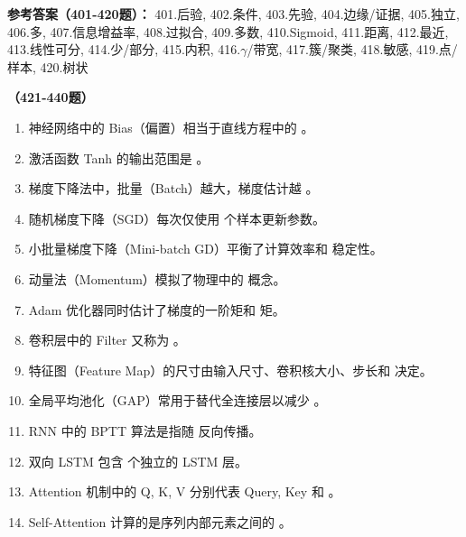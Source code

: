 \textbf{参考答案（401-420题）：}
401.后验, 402.条件, 403.先验, 404.边缘/证据, 405.独立, 406.多, 407.信息增益率, 408.过拟合, 409.多数, 410.Sigmoid, 411.距离, 412.最近, 413.线性可分, 414.少/部分, 415.内积, 416.$\gamma$/带宽, 417.簇/聚类, 418.敏感, 419.点/样本, 420.树状

\vspace{1em}
\textbf{（421-440题）}
\begin{enumerate}[resume,leftmargin=2em,itemsep=1pt]
\item 神经网络中的 Bias（偏置）相当于直线方程中的 \underline{\hspace{3em}}。
\item 激活函数 Tanh 的输出范围是 \underline{\hspace{3em}}。
\item 梯度下降法中，批量（Batch）越大，梯度估计越 \underline{\hspace{3em}}。
\item 随机梯度下降（SGD）每次仅使用 \underline{\hspace{3em}} 个样本更新参数。
\item 小批量梯度下降（Mini-batch GD）平衡了计算效率和 \underline{\hspace{3em}} 稳定性。
\item 动量法（Momentum）模拟了物理中的 \underline{\hspace{3em}} 概念。
\item Adam 优化器同时估计了梯度的一阶矩和 \underline{\hspace{3em}} 矩。
\item 卷积层中的 Filter 又称为 \underline{\hspace{3em}}。
\item 特征图（Feature Map）的尺寸由输入尺寸、卷积核大小、步长和 \underline{\hspace{3em}} 决定。
\item 全局平均池化（GAP）常用于替代全连接层以减少 \underline{\hspace{3em}}。
\item RNN 中的 BPTT 算法是指随 \underline{\hspace{3em}} 反向传播。
\item 双向 LSTM 包含 \underline{\hspace{3em}} 个独立的 LSTM 层。
\item Attention 机制中的 Q, K, V 分别代表 Query, Key 和 \underline{\hspace{3em}}。
\item Self-Attention 计算的是序列内部元素之间的 \underline{\hspace{3em}}。

\end{enumerate}
